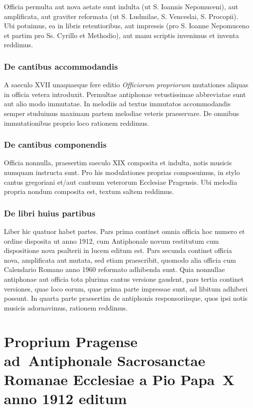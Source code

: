 \documentclass[12pt, a5paper, twoside]{book}
\begin{document}
Officia permulta aut nova aetate sunt indulta
(ut S. Ioannis Nepomuceni),
aut amplificata,
aut graviter reformata (ut S. Ludmilae, S. Venceslai, S. Procopii).
Ubi potuimus, ea in libris retentioribus, aut impressis
(pro S. Ioanne Nepomuceno et partim pro Ss. Cyrillo et Methodio),
aut manu scriptis invenimus et inventa reddimus.

\section*{De cantibus accommodandis}
A saeculo XVII unaquaeque fere editio \emph{Officiorum propriorum}
mutationes aliquas in officia vetera introduxit.
Permultae antiphonae vetustissimae abbreviatae sunt aut
alio modo immutatae.
In melodiis ad textus immutatos accommodandis semper studuimus
maximam partem melodiae veteris praeservare.
De omnibus immutationibus proprio loco rationem reddimus.

\section*{De cantibus componendis}
Officia nonnulla, praesertim saeculo XIX composita et indulta,
notis musicis numquam instructa sunt.
Pro his modulationes proprias composuimus, in stylo cantus gregoriani
et/aut cantuum veterorum Ecclesiae Pragensis.
Ubi melodia propria nondum composita est, textum saltem reddimus.

\section*{De libri huius partibus}
Liber hic quatuor habet partes.
Pars prima continet omnia officia hoc numero et ordine disposita
ut anno 1912, cum Antiphonale novum restitutum
cum dispositione nova psalterii in lucem editum est.
Pars secunda continet officia nova, amplificata aut mutata,
sed etiam praescribit, quomodo alia officia cum
Calendario Romano anno 1960 reformato adhibenda sunt.
Quia nonnullae antiphonae aut officia tota plurima cantus versione
gaudent, pars tertia continet versiones, quae loco eorum,
quae prima parte impressae sunt, ad libitum adhiberi possunt.
In quarta parte praesertim de antiphonis responsoriisque,
quos ipsi notis musicis adornavimus, rationem reddimus.

\part{Proprium Pragense ad~Antiphonale Sacrosanctae Romanae Ecclesiae
  a Pio Papa~X anno 1912 editum}
\end{document}

